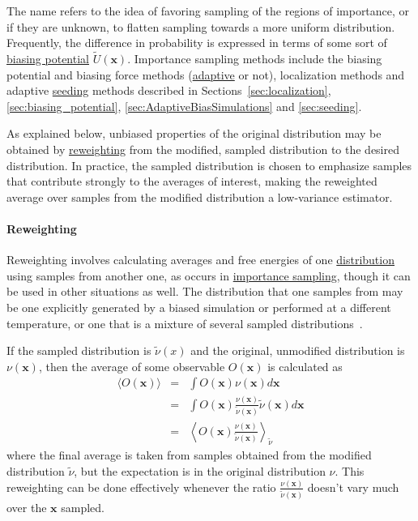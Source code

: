 \documentclass[9pt,review]{livecoms}
\newcommand{\vx}{\mathbf{x}}
\begin{document}

The name refers to the idea of favoring sampling of the regions of importance, or if they are unknown, to flatten sampling towards a more uniform distribution. Frequently, the difference in probability is expressed in terms of some sort of \hyperlink{ref:biasingE} {biasing potential} $\tilde U(\vx)$. Importance sampling methods include the biasing potential and biasing force methods (\hyperlink{ref:Adaptive} {adaptive} or not), localization methods and adaptive \hyperlink{ref:Seeding} {seeding} methods described in Sections~\ref{sec:localization}, \ref{sec:biasing_potential}, \ref{sec:AdaptiveBiasSimulations} and \ref{sec:seeding}.

As explained below, unbiased properties of the original distribution may be obtained by \hyperlink{ref:Reweighting} {reweighting} from the modified, sampled distribution to the desired distribution.
In practice, the  sampled distribution is chosen to emphasize samples that contribute strongly to the averages of interest, making the reweighted average over samples from the modified distribution a low-variance estimator.


\hypertarget{ref:Reweighting} {\paragraph{Reweighting}}
Reweighting involves calculating averages and free energies of one \hyperlink{ref:Distribution} {distribution} using samples from another one, as occurs in \hyperlink{ref:IS} {importance sampling}, though it can be used in other situations as well. The distribution that one samples from  may be one explicitly generated by a biased simulation or performed at a different temperature, or one that is a mixture of several sampled distributions~\cite{reweighting_mixture_distribution}. 

If the sampled distribution is $\tilde \nu(x)$ and the original, unmodified distribution is $\nu(\vx)$, then the average of some observable $O(\vx)$ is calculated as 
\begin{eqnarray}
\langle O(\vx) \rangle &=& \int  O(\vx) \nu(\vx) d\vx \nonumber \\
&=& \int O(\vx) \frac{\nu(\vx)}{\tilde \nu(\vx)} \tilde \nu(\vx) d\vx\nonumber \\
&=& \left \langle O(\vx)  \frac{\nu(\vx)}{\tilde{\nu}(\vx)} \right \rangle_{\tilde \nu}
\end{eqnarray}
where the final average is taken from samples obtained from the modified distribution $\tilde \nu$, but the expectation is in the original distribution $\nu$.  This reweighting can be done effectively whenever the ratio $\frac{\nu(\vx)}{\tilde \nu(\vx)}$ doesn't vary much over the $\vx$ sampled. 
\end{document}
